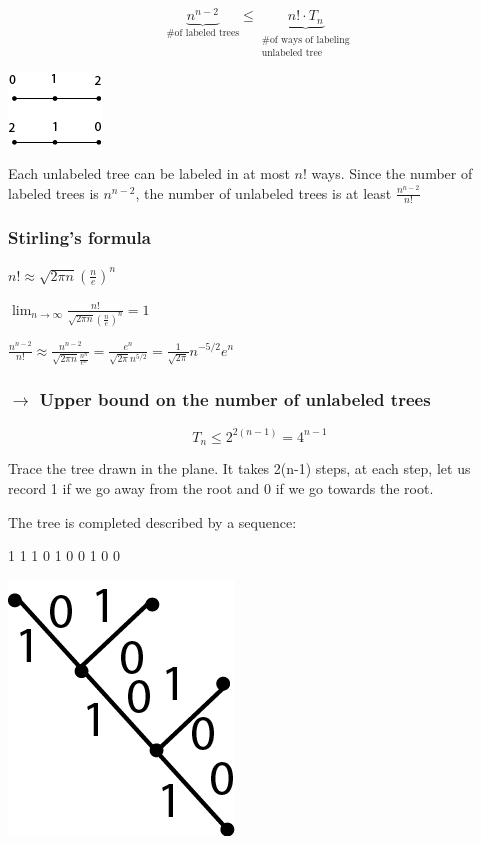 \documentclass[9pt, letterpaper, oneside]{article}
\begin{document}
$$\displaystyle \underbrace{n^{n-2}}_{\text{\# of labeled trees}} \leq \underbrace{n! \cdot T_n}_{\substack{\text{\#of ways of labeling} \\ \text{unlabeled tree}}}$$

\includegraphics{fig6.png}

Each unlabeled tree can be labeled in at most $n!$ ways. Since the number of labeled trees is $n^{n-2}$, the number of unlabeled trees is at least $\frac{n^{n-2}}{n!}$

\subsubsection*{Stirling's formula}

$\displaystyle n! \approx \sqrt{2\pi n} (\frac{n}{e})^n$

$\displaystyle \lim_{n \to \infty} \frac{n!}{\sqrt{2\pi n}(\frac{n}{e})^n} = 1$

$\displaystyle \frac{n^{n-2}}{n!} \approx \frac{n^{n-2}}{\sqrt{2 \pi n}\frac{n^n}{e^n}} = \frac{e^n}{\sqrt{2 \pi}n^{5/2}} = \frac{1}{\sqrt{2 \pi}}n^{-5/2}e^n$

\subsubsection*{$\to$ Upper bound on the number of unlabeled trees}
$$T_n \leq 2^{2(n-1)} = 4^{n-1}$$

Trace the tree drawn in the plane. It takes 2(n-1) steps, at each step, let us record 1 if we go away from the root and 0 if we go towards the root. 

The tree is completed described by a sequence:

1 1 1 0 1 0 0 1 0 0

\includegraphics{fig7bis.png}
\end{document}
